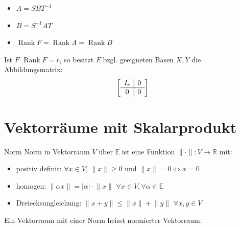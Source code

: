 \documentclass[a4paper,10pt]{article}
\DeclareMathOperator{\Rank}{Rank}
\def\E{\mathbb{E}}
\begin{document}
\begin{multicols}{2}
  \begin{subbox}{}
    \begin{itemize}
      \item $A = SBT^{-1}$
      \item $B = S^{-1}AT$
      \item $\Rank F = \Rank A = \Rank B$
    \end{itemize}
  \end{subbox}
\end{multicols}

Ist $F$ $\Rank F = r$, so besitzt $F$ bzgl. geeigneten Basen $X, Y$ die Abbildungsmatrix: 
\[
  \left[\begin{array}{ c | c }
    I_r & 0 \\
    \hline
    0 & 0
  \end{array}\right]
\]

\section{Vektorräume mit Skalarprodukt}

\begin{subbox}{Norm}
  Norm in Vektorraum $V$ über $\mathbb{E}$ ist eine Funktion $\lVert \cdot \rVert: V \mapsto \mathbb{R}$ mit:
  \begin{itemize}
    \item positiv definit: $\forall x \in V$, $\lVert x \rVert \geq 0$ und $\lVert x \rVert = 0 \iff x = 0$
    \item homogen: $\lVert \alpha x \rVert = \lvert \alpha \rvert \cdot \lVert x \rVert$ $\forall x \in V, \forall \alpha \in \mathbb{E}$
    \item Dreiecksungleichung: $\lVert x + y \rVert \leq \lVert x \rVert + \lVert y \rVert$ $\forall x, y \in V$
  \end{itemize}
  Ein Vektorraum mit einer Norm heisst normierter Vektorraum.
\end{subbox}
\end{document}
